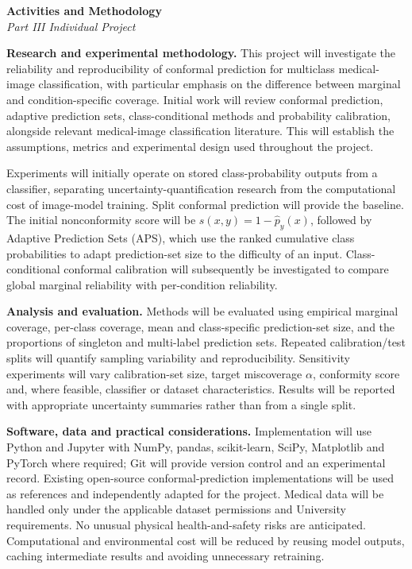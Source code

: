 \documentclass[12pt,a4paper]{article}
\begin{document}
\begin{center}
    {\large\textbf{Activities and Methodology}}\\[0.4em]
    \textit{Part III Individual Project}
\end{center}

\textbf{Research and experimental methodology.}
This project will investigate the reliability and reproducibility of conformal prediction for multiclass medical-image classification, with particular emphasis on the difference between marginal and condition-specific coverage. Initial work will review conformal prediction, adaptive prediction sets, class-conditional methods and probability calibration, alongside relevant medical-image classification literature. This will establish the assumptions, metrics and experimental design used throughout the project.

Experiments will initially operate on stored class-probability outputs from a classifier, separating uncertainty-quantification research from the computational cost of image-model training. Split conformal prediction will provide the baseline. The initial nonconformity score will be $s(x,y)=1-\hat p_y(x)$, followed by Adaptive Prediction Sets (APS), which use the ranked cumulative class probabilities to adapt prediction-set size to the difficulty of an input. Class-conditional conformal calibration will subsequently be investigated to compare global marginal reliability with per-condition reliability.

\textbf{Analysis and evaluation.}
Methods will be evaluated using empirical marginal coverage, per-class coverage, mean and class-specific prediction-set size, and the proportions of singleton and multi-label prediction sets. Repeated calibration/test splits will quantify sampling variability and reproducibility. Sensitivity experiments will vary calibration-set size, target miscoverage $\alpha$, conformity score and, where feasible, classifier or dataset characteristics. Results will be reported with appropriate uncertainty summaries rather than from a single split.

\textbf{Software, data and practical considerations.}
Implementation will use Python and Jupyter with NumPy, pandas, scikit-learn, SciPy, Matplotlib and PyTorch where required; Git will provide version control and an experimental record. Existing open-source conformal-prediction implementations will be used as references and independently adapted for the project. Medical data will be handled only under the applicable dataset permissions and University requirements. No unusual physical health-and-safety risks are anticipated. Computational and environmental cost will be reduced by reusing model outputs, caching intermediate results and avoiding unnecessary retraining.
\end{document}
